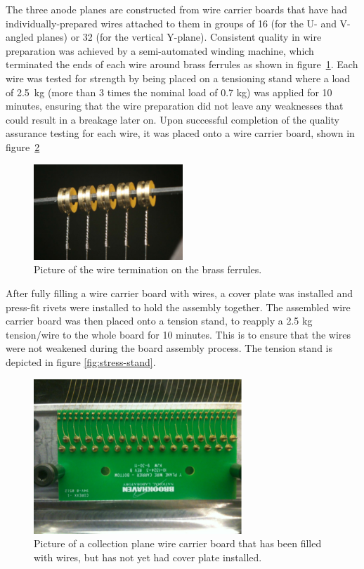 The three anode planes are constructed from wire carrier boards that have had individually-prepared wires attached to them in groups of 16 (for the U- and V- angled planes) or 32 (for the vertical Y-plane).  Consistent quality in wire preparation was achieved by a semi-automated winding machine, which terminated the ends of each wire around brass ferrules as shown in figure~\ref{fig:ferrules}. Each wire was tested for strength by being placed on a tensioning stand where a load of 2.5~kg (more than 3 times the nominal load of 0.7 kg) was applied for 10 minutes, ensuring that the wire preparation did not leave any weaknesses that could result in a breakage later on.  Upon successful completion of the quality assurance testing for each wire, it was placed onto a wire carrier board, shown in figure~\ref{fig:carrier-boards}

\begin{figure}[htb]
\centering
\includegraphics[width=0.5\textwidth]{figures/wire-twist.pdf}
\caption{Picture of the wire termination on the brass ferrules.}
\label{fig:ferrules}
\end{figure}




 After fully filling a wire carrier board with wires, a cover plate was installed and press-fit rivets were installed to hold the assembly together. The assembled wire carrier board was then placed onto a tension stand, to reapply a 2.5 kg tension/wire to the whole board for 10 minutes. This is to ensure that the wires were not weakened during the board assembly process. The tension stand is depicted in figure \ref{fig:stress-stand}.

\begin{figure}[htb]
\centering
\includegraphics[angle =0,width=0.7\textwidth]{figures/wire-carrierboard.png}
\caption{Picture of a collection plane wire carrier board that has been filled with wires, but has not yet had cover plate installed.}
\label{fig:carrier-boards}
\end{figure}


